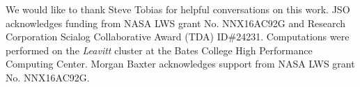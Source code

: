 \documentclass[aps,prl,reprint,superscriptaddress]{revtex4-1}
\begin{document}

\begin{acknowledgments}
We would like to thank Steve Tobias for helpful conversations on this work.
JSO acknowledges funding from NASA LWS grant No. NNX16AC92G and Research Corporation Scialog Collaborative Award (TDA) ID\#24231. Computations were performed on the \emph{Leavitt} cluster at the Bates College High Performance Computing Center.
Morgan Baxter acknowledges support from NASA LWS grant No. NNX16AC92G.
\end{acknowledgments}


\end{document}
